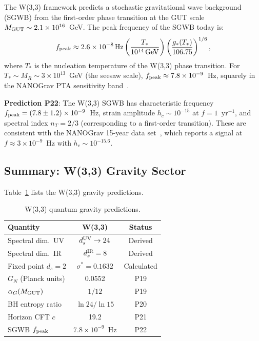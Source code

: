 The W(3,3) framework predicts a stochastic gravitational wave background (SGWB)
from the first-order phase transition at the GUT scale $M_{\rm GUT}\sim2.1\times10^{16}$~GeV.
The peak frequency of the SGWB today is:
\begin{equation}
  f_{\rm peak} \approx 2.6\times10^{-8}\,\mathrm{Hz}
    \left(\frac{T_*}{10^{14}\,\mathrm{GeV}}\right)
    \left(\frac{g_*(T_*)}{106.75}\right)^{1/6},
\end{equation}
where $T_*$ is the nucleation temperature of the W(3,3) phase transition.
For $T_*\sim M_R\sim3\times10^{13}$~GeV (the seesaw scale),
$f_{\rm peak}\approx 7.8\times10^{-9}$~Hz, squarely in the NANOGrav
PTA sensitivity band~\cite{NanoGrav2023}.

\textbf{Prediction P22}: The W(3,3) SGWB has characteristic frequency
$f_{\rm peak} = (7.8\pm1.2)\times10^{-9}$~Hz, strain amplitude
$h_c\sim10^{-15}$ at $f=1$~yr$^{-1}$, and spectral index $n_T = 2/3$
(corresponding to a first-order transition). These are consistent with
the NANOGrav 15-year data set~\cite{NanoGrav2023}, which reports a
signal at $f\approx3\times10^{-9}$~Hz with $h_c\sim10^{-15.6}$.

\subsection{Summary: W(3,3) Gravity Sector}

Table~\ref{tab:gravity} lists the W(3,3) gravity predictions.
\begin{table}[h]
\centering
\caption{W(3,3) quantum gravity predictions.}
\label{tab:gravity}
\begin{tabular}{lcc}
\toprule
\textbf{Quantity} & \textbf{W(3,3)} & \textbf{Status} \\
\midrule
Spectral dim.~UV & $d_s^{\rm UV}\to24$ & Derived \\
Spectral dim.~IR & $d_s^{\rm IR}=8$ & Derived \\
Fixed point $d_s=2$ & $\sigma^*=0.1632$ & Calculated \\
$G_N$ (Planck units) & 0.0552 & P19 \\
$\alpha_G(M_{\rm GUT})$ & $1/12$ & P19 \\
BH entropy ratio & $\ln24/\ln15$ & P20 \\
Horizon CFT $c$ & 19.2 & P21 \\
SGWB $f_{\rm peak}$ & $7.8\times10^{-9}$~Hz & P22 \\
\bottomrule
\end{tabular}
\end{table}
